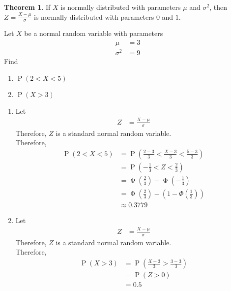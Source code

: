 \documentclass[titlepage, fleqn, a4paper, 12pt, twoside]{article}
\theoremstyle{definition}
\theoremstyle{theorem}
\newtheorem{theorem}{Theorem}
\DeclareMathOperator{\prob}{\mathrm{P}}
\DeclareMathOperator{\stdnormalcdf}{\mathrm{\Phi}}
\begin{document}
\begin{theorem}
	If $X$ is normally distributed with parameters $\mu$ and $\sigma^2$, then $Z = \frac{X - \mu}{\sigma}$ is normally distributed with parameters $0$ and $1$.
\end{theorem}

\begin{question}
	Let $X$ be a normal random variable with parameters
	\begin{align*}
		\mu &= 3\\
		\sigma^2 &= 9
	\end{align*}
	Find
	\begin{enumerate}
		\item $\prob(2 < X < 5)$
		\item $\prob(X > 3)$
	\end{enumerate}
\end{question}

\begin{solution}
	\begin{enumerate}[leftmargin=*]
		\item
			Let
			\begin{align*}
				Z &= \frac{X - \mu}{\sigma}
			\end{align*}
			Therefore, $Z$ is a standard normal random variable.\\
			Therefore,
			\begin{align*}
				\prob(2 < X < 5) &= \prob\left( \frac{2 - 3}{3} < \frac{X - 3}{3} < \frac{5 - 3}{3} \right)\\
				&= \prob\left( -\frac{1}{3} < Z < \frac{2}{3} \right)\\
				&= \stdnormalcdf\left( \frac{2}{3} \right) - \stdnormalcdf\left( -\frac{1}{3} \right)\\
				&= \stdnormalcdf\left( \frac{2}{3} \right) - \left( 1 - \Phi\left( \frac{1}{3} \right) \right)\\
				&\approx 0.3779
			\end{align*}
		\item
			Let
			\begin{align*}
				Z &= \frac{X - \mu}{\sigma}
			\end{align*}
			Therefore, $Z$ is a standard normal random variable.\\
			Therefore,
			\begin{align*}
				\prob(X > 3) &= \prob\left( \frac{X - 3}{3} > \frac{3 - 3}{3} \right)\\
				&= \prob(Z > 0)\\
				&= 0.5
			\end{align*}
	\end{enumerate}
\end{solution}
\end{document}
